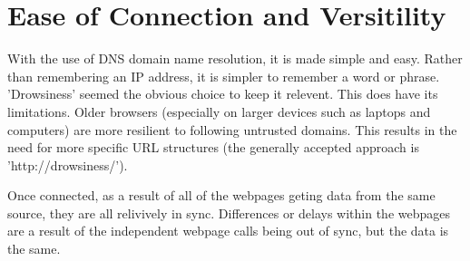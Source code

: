 \section{Ease of Connection and Versitility}
With the use of DNS domain name resolution, it is made simple and easy. Rather than remembering an IP address, it is simpler
to remember a word or phrase. 'Drowsiness' seemed the obvious choice to keep it relevent. This does have its limitations.
Older browsers (especially on larger devices such as laptops and computers) are more resilient to following untrusted
domains. This results in the need for more specific URL structures (the generally accepted approach is 'http://drowsiness/').

Once connected, as a result of all of the webpages geting data from the same source, they are all relivively in sync. Differences or
delays within the webpages are a result of the independent webpage calls being out of sync, but the data is the same.
